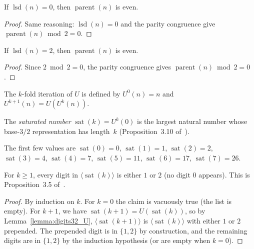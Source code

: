 \begin{lemma}\label{lemma:even_of_lsd_zero}\leanok
If $\operatorname{lsd}(n) = 0$, then $\operatorname{parent}(n)$ is even.
\end{lemma}
\begin{proof}\leanok
Same reasoning: $\operatorname{lsd}(n) = 0$ and the parity congruence give
$\operatorname{parent}(n) \bmod 2 = 0$.
\end{proof}

\begin{lemma}\label{lemma:even_of_lsd_two}\leanok
If $\operatorname{lsd}(n) = 2$, then $\operatorname{parent}(n)$ is even.
\end{lemma}
\begin{proof}\leanok
Since $2 \bmod 2 = 0$, the parity congruence gives
$\operatorname{parent}(n) \bmod 2 = 0$.
\end{proof}


\begin{definition}\label{def:U_iter}\leanok
The $k$-fold iteration of $U$ is defined by $U^0(n) = n$ and $U^{k+1}(n) = U(U^k(n))$.
\end{definition}

\begin{definition}\label{def:sat}\leanok
The \emph{saturated number} $\operatorname{sat}(k) = U^k(0)$ is the largest
natural number whose base-$3/2$ representation has length~$k$
(Proposition~3.10 of~\cite{eli25}).
\end{definition}

The first few values are $\operatorname{sat}(0)=0$, $\operatorname{sat}(1)=1$,
$\operatorname{sat}(2)=2$, $\operatorname{sat}(3)=4$, $\operatorname{sat}(4)=7$,
$\operatorname{sat}(5)=11$, $\operatorname{sat}(6)=17$, $\operatorname{sat}(7)=26$.

\begin{lemma}\label{lemma:digits32_sat_no_zero}\leanok
For $k \ge 1$, every digit in $\langle \operatorname{sat}(k) \rangle$ is
either $1$ or $2$ (no digit $0$ appears).
This is Proposition~3.5 of~\cite{eli25}.
\end{lemma}
\begin{proof}\leanok
By induction on $k$.  For $k = 0$ the claim is vacuously true (the list is empty).
For $k + 1$, we have $\operatorname{sat}(k+1) = U(\operatorname{sat}(k))$, so by
Lemma~\ref{lemma:digits32_U}, $\langle \operatorname{sat}(k+1) \rangle$
is $\langle \operatorname{sat}(k) \rangle$ with either $1$ or $2$
prepended.  The prepended digit is in $\{1,2\}$ by construction, and the
remaining digits are in $\{1,2\}$ by the induction hypothesis (or are
empty when $k = 0$).
\end{proof}

